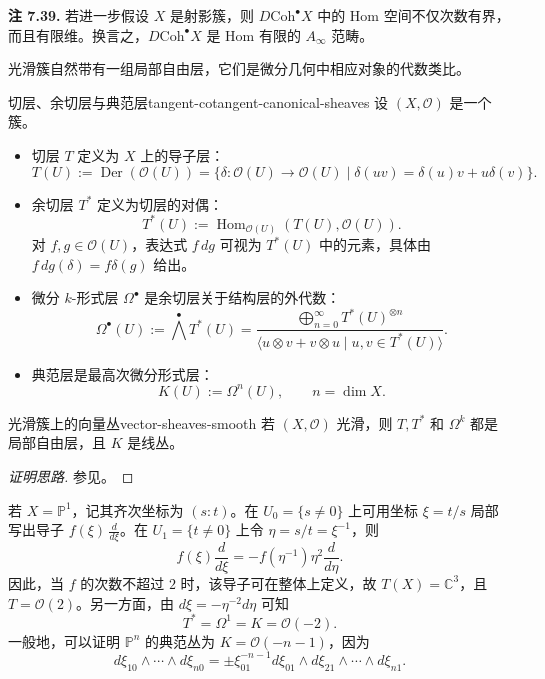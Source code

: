 \begin{note}\label{note:projective-derived-hom-finite}
\textbf{注 7.39.} 若进一步假设 $X$ 是射影簇，则 $D\mathrm{Coh}^{\bullet}X$ 中的 Hom 空间不仅次数有界，而且有限维。换言之，$D\mathrm{Coh}^{\bullet}X$ 是 Hom 有限的 $A_\infty$ 范畴。
\end{note}

光滑簇自然带有一组局部自由层，它们是微分几何中相应对象的代数类比。

\begin{definition}{切层、余切层与典范层}{tangent-cotangent-canonical-sheaves}
设 $(X,\mathcal O)$ 是一个簇。
\begin{itemize}
  \item 切层 $T$ 定义为 $X$ 上的导子层：
  \[
    T(U):=\operatorname{Der}(\mathcal O(U))
    =\{\delta\colon\mathcal O(U)\to\mathcal O(U)\mid
    \delta(uv)=\delta(u)v+u\delta(v)\}.
  \]
  \item 余切层 $T^*$ 定义为切层的对偶：
  \[
    T^*(U):=\operatorname{Hom}_{\mathcal O(U)}(T(U),\mathcal O(U)).
  \]
  对 $f,g\in\mathcal O(U)$，表达式 $f\,dg$ 可视为 $T^*(U)$ 中的元素，具体由 $f\,dg(\delta)=f\delta(g)$ 给出。
  \item 微分 $k$-形式层 $\Omega^\bullet$ 是余切层关于结构层的外代数：
  \[
    \Omega^\bullet(U):=\bigwedge^\bullet T^*(U)
    =\frac{\displaystyle\bigoplus_{n=0}^{\infty}T^*(U)^{\otimes n}}
      {\langle u\otimes v+v\otimes u\mid u,v\in T^*(U)\rangle}.
  \]
  \item 典范层是最高次微分形式层：
  \[
    K(U):=\Omega^n(U),\qquad n=\dim X.
  \]
\end{itemize}
\end{definition}

\begin{theorem}{光滑簇上的向量丛}{vector-sheaves-smooth}
若 $(X,\mathcal O)$ 光滑，则 $T,T^*$ 和 $\Omega^k$ 都是局部自由层，且 $K$ 是线丛。
\end{theorem}
\begin{proof}[证明思路]
参见。
\end{proof}

\begin{example}[射影空间的典范丛]
若 $X=\mathbb P^1$，记其齐次坐标为 $(s:t)$。在 $U_0=\{s\ne0\}$ 上可用坐标 $\xi=t/s$ 局部写出导子 $f(\xi)\,\frac d{d\xi}$。在 $U_1=\{t\ne0\}$ 上令 $\eta=s/t=\xi^{-1}$，则
\[
  f(\xi)\frac d{d\xi}
  =-f(\eta^{-1})\eta^2\frac d{d\eta}.
\]
因此，当 $f$ 的次数不超过 $2$ 时，该导子可在整体上定义，故 $T(X)=\mathbb C^3$，且 $T=\mathcal O(2)$。另一方面，由 $d\xi=-\eta^{-2}d\eta$ 可知
\[
  T^*=\Omega^1=K=\mathcal O(-2).
\]
一般地，可以证明 $\mathbb P^n$ 的典范丛为 $K=\mathcal O(-n-1)$，因为
\[
  d\xi_{10}\wedge\cdots\wedge d\xi_{n0}
  =\pm\xi_{01}^{-n-1}
  d\xi_{01}\wedge d\xi_{21}\wedge\cdots\wedge d\xi_{n1}.
\]
\end{example}

